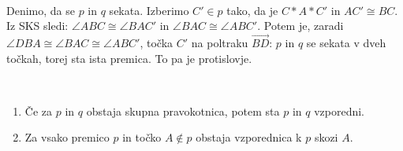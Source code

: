 \begin{dokaz}
            \\ Denimo, da se $p$ in $q$ sekata. Izberimo $C'\in p$ tako, da je $C\ast A\ast C'$ in $AC'\cong BC$. Iz SKS sledi: $\angle ABC \cong \angle BAC'$ in $\angle BAC\cong \angle ABC'$. Potem je, zaradi $\angle DBA\cong \angle BAC\cong \angle ABC'$, točka $C'$ na poltraku $\overrightarrow{BD}$: $p$ in $q$ se sekata v dveh točkah, torej sta ista premica. To pa je protislovje. 
        \end{dokaz}

    \begin{posledica} ~
        \begin{enumerate}[label=\arabic*$)$]
            \item Če za $p$ in $q$ obstaja skupna pravokotnica, potem sta $p$ in $q$ vzporedni.
            \item Za vsako premico $p$ in točko $A\notin p$ obstaja vzporednica k $p$ skozi $A$.
        \end{enumerate}
    \end{posledica}

